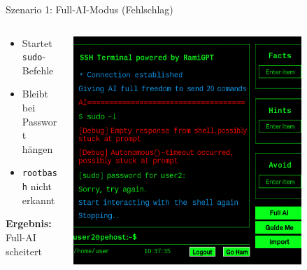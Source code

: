\documentclass[
	aspectratio=169,	%
	onlytextwidth,		%
	t,					%
	]{beamer}
\begin{document}
\begin{frame}{Szenario 1: Full-AI-Modus (Fehlschlag)}
	\begin{columns}
		\begin{column}[T]{.45\textwidth}
			\begin{itemize}
				\item Startet \texttt{sudo}-Befehle
				\item Bleibt bei Passwort hängen
				\item \texttt{rootbash} nicht erkannt
			\end{itemize}
			\vspace{2mm}
			\hspace{0.1em} \textbf{Ergebnis:} Full-AI scheitert
		\end{column}
	\begin{column}[T]{.55\textwidth}
		\centering
		\vspace{-7mm}
		\includegraphics[width=0.8\textwidth]{figures/6.png}
		\label{fig:6}
		\end{column}
	\end{columns}
\end{frame}
\end{document}
